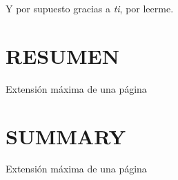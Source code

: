 \documentclass[spanish,12pt, a4paper,twoside]{article}
\let\oldsection\section
\def\section{\cleardoublepage\oldsection}
\newcommand\blankpage{
    \null
    \thispagestyle{empty}
    \addtocounter{page}{-1}
    \newpage
}
\begin{document}
    Y por supuesto gracias a \textit{ti}, por leerme.

    \section*{RESUMEN}
    Extensión máxima de una página %


    \section*{SUMMARY}
    Extensión máxima de una página


    \tableofcontents %



    \listoffigures

    \listoftables
    
    \listofalgorithms
	\afterpage{\blankpage}
	
    \newpage
	

    
    \newpage

    
    \newpage

   	
   	\newpage

    
    \newpage
    
    
    \newpage
    
    
    \newpage
    

	\begin{appendices}
	
    
	\newpage

 	
	\newpage
	
 	
	\newpage
	
 	
	\newpage
	
 	
	\newpage
	
 	
	\newpage

	\end{appendices}

    \newpage

    \normalem
    
    
\end{document}
